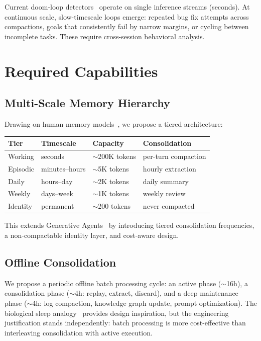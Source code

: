 \documentclass{article}
\begin{document}
Current doom-loop detectors~\cite{grokbuild_doomloop} operate on single inference streams (seconds). At continuous scale, slow-timescale loops emerge: repeated bug fix attempts across compactions, goals that consistently fail by narrow margins, or cycling between incomplete tasks. These require cross-session behavioral analysis.

\section{Required Capabilities}
\label{sec:capabilities}

\subsection{Multi-Scale Memory Hierarchy}
\label{sec:memory}

Drawing on human memory models~\cite{atkinson1968human}, we propose a tiered architecture:

\begin{table}[h]
\centering
\small
\begin{tabular}{llll}
\toprule
\textbf{Tier} & \textbf{Timescale} & \textbf{Capacity} & \textbf{Consolidation} \\
\midrule
Working & seconds & ${\sim}$200K tokens & per-turn compaction \\
Episodic & minutes--hours & ${\sim}$5K tokens & hourly extraction \\
Daily & hours--day & ${\sim}$2K tokens & daily summary \\
Weekly & days--week & ${\sim}$1K tokens & weekly review \\
Identity & permanent & ${\sim}$200 tokens & never compacted \\
\bottomrule
\end{tabular}
\end{table}

This extends Generative Agents~\cite{park2023generative} by introducing tiered consolidation frequencies, a non-compactable identity layer, and cost-aware design.

\subsection{Offline Consolidation}
\label{sec:sleep}

We propose a periodic offline batch processing cycle: an active phase (${\sim}$16h), a consolidation phase (${\sim}$4h: replay, extract, discard), and a deep maintenance phase (${\sim}$4h: log compaction, knowledge graph update, prompt optimization). The biological sleep analogy~\cite{diekelmann2010sleep} provides design inspiration, but the engineering justification stands independently: batch processing is more cost-effective than interleaving consolidation with active execution.
\end{document}
